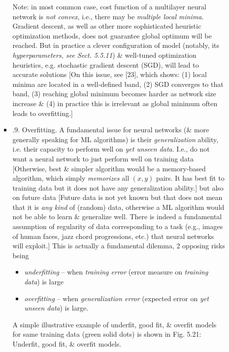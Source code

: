 \documentclass{article}
\begin{document}
\begin{itemize}
\begin{itemize}
\begin{itemize}
			Note: in most common case, cost function of a multilayer neural network is {\it not convex}, i.e., there may be {\it multiple local minima}. Gradient descent, as well as other more sophisticated heuristic optimization methods, does not guarantee global optimum will be reached. But in practice a clever configuration of model (notably, its {\it hyperparameters, see Sect. 5.5.11}) \& well-tuned optimization heuristics, e.g. stochastic gradient descent (SGD), will lead to accurate solutions [On this issue, see [23], which shows: (1) local minima are located in a well-defined band, (2) SGD converges to that band, (3) reaching global minimum becomes harder as network size increase \& (4) in practice this is irrelevant as global minimum often leads to overfitting.]
			\item {.9. Overfitting.} A fundamental issue for neural networks (\& more generally speaking for ML algorithms) is their {\it generalization} ability, i.e. their capacity to perform well on {\it yet unseen data}. I.e., do not want a neural network to just perform well on training data [Otherwise, best \& simpler algorithm would be a memory-based algorithm, which simply {\it memorizes} all $(x,y)$ pairs. It has best fit to training data but it does not have any generalization ability.] but also on future data [Future data is not yet known but that does not mean that it is {\it any kind} of (random) data, otherwise a ML algorithm would not be able to learn \& generalize well. There is indeed a fundamental assumption of regularity of data corresponding to a task (e.g., images of human faces, jazz chord progressions, etc.) that neural networks will exploit.] This is actually a fundamental dilemma, 2 opposing risks being
			\begin{itemize}
				\item {\it underfitting} -- when {\it training error} (error measure on {\it training data}) is large
				\item {\it overfitting} -- when {\it generalization error} (expected error on {\it yet unseen data}) is large.
			\end{itemize}
			A simple illustrative example of underfit, good fit, \& overfit models for same training data (green solid dots) is shown in {\sf Fig. 5.21: Underfit, good fit, \& overfit models.}
			

\end{itemize}
\end{itemize}
\end{itemize}
\end{document}
